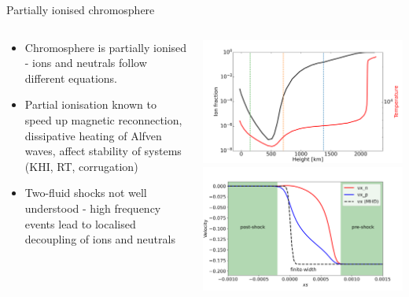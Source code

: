 \documentclass[10pt,aspectratio=169,usenames,dvipsnames]{beamer}
\begin{document}
\begin{frame}{Partially ionised chromosphere}
\begin{columns}
\begin{column}{0.5\textwidth}
\begin{itemize}
    \item Chromosphere is partially ionised - ions and neutrals follow different equations.
    \item Partial ionisation known to speed up magnetic reconnection, dissipative heating of Alfven waves, affect stability of systems (KHI, RT, corrugation)
    \item Two-fluid shocks not well understood - high frequency events lead to localised decoupling of ions and neutrals
\end{itemize}
\end{column}
\begin{column}{0.5\textwidth}
\includegraphics[width=0.9\linewidth]{2023StAndrews/Figures/saha2_plot.png} \\
\includegraphics[width=0.95\linewidth]{2023RAS/Figures/shocksub_col.png} \\
\end{column}
\end{columns}
\end{frame}
\end{document}
